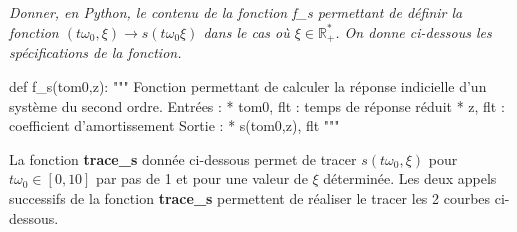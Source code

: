 \documentclass[10pt]{article}
\newif\ifprof
\begin{document}
\fi

\subparagraph{} \textit{Donner, en Python, le contenu de la fonction \textsf{f\_s} permettant de définir la fonction $(t\omega_0,\xi) \rightarrow s(t\omega_0\xi)$ dans le cas où $\xi\in \mathbb{R}_+^*$. On donne ci-dessous les spécifications de la fonction.}

\begin{py}
\begin{python}
def f_s(tom0,z):
    """
    Fonction permettant de calculer la réponse indicielle d'un système du second ordre. 
    Entrées : 
        * tom0, flt : temps de réponse réduit
        * z, flt : coefficient d'amortissement
    Sortie : 
        * s(tom0,z), flt
    """
\end{python}
\end{py}

\ifprof
\begin{corrige}
\begin{py}
\begin{python}
def f_s(tom0,z) :
    """
    Fonction permettant de calculer la réponse indicielle d'un système du second ordre. 
    Entrées : 
        * tom0, flt : temps de réponse réduit
        * z, flt : coefficient d'amortissement
    Sortie : 
        * s(tom0,z), flt
    """
    if z<0 :
        return None
    elif z<1 :
        return f2_pseudo(tom0,z)
    elif z==1:
        return f2_critique(tom0)
    else : 
        return f2_aperiodique(tom0,z)
\end{python}
\end{py}
\end{corrige}
\else

\fi

La fonction \textbf{\textsf{trace\_s}} donnée ci-dessous permet de tracer $s(t\omega_0,\xi)$ pour $t\omega_0 \in [0,10]$ par pas de 1 et pour une valeur de $\xi$ déterminée. Les deux appels successifs de la fonction \textbf{\textsf{trace\_s}} permettent de réaliser le tracer les 2 courbes ci-dessous.
\end{document}
